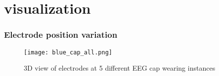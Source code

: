 \section{visualization}
\begin{frame}
	\frametitle{Electrode position variation}
	\begin{figure}[hbt!]
		\centering
		\texttt{[image: blue\_cap\_all.png]}
		\caption{3D view of electrodes at 5 different EEG cap wearing instances} 
		\label{fig:blue_cap_all}
	\end{figure}		
\end{frame}


